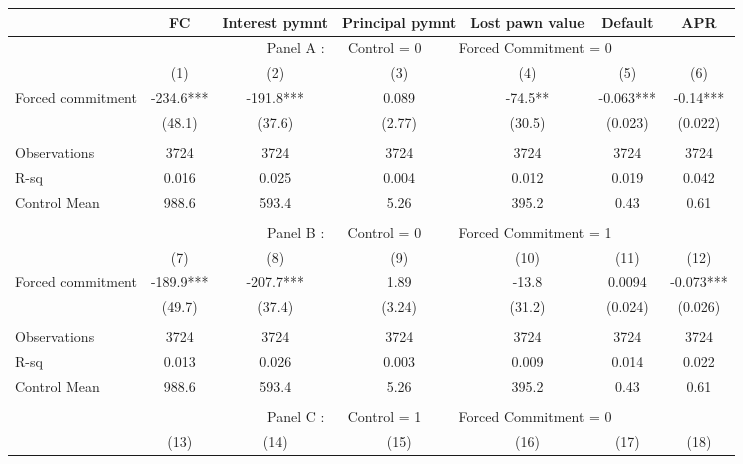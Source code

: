 \begin{tabular}{lcccccc}
\toprule
      & FC    & Interest pymnt & Principal pymnt & Lost pawn value & Default & APR \\
\midrule
      & \multicolumn{6}{c}{Panel A : $\quad$ Control  = 0           $\quad\quad$                  Forced Commitment = 0} \\
\midrule
\midrule
      & (1)   & (2)   & (3)   & (4)   & (5)   & (6) \\
\midrule
\midrule
Forced commitment  & -234.6*** & -191.8*** & 0.089 & -74.5** & -0.063*** & -0.14*** \\
      & (48.1) & (37.6) & (2.77) & (30.5) & (0.023) & (0.022) \\
      &       &       &       &       &       &  \\
\midrule
Observations & 3724  & 3724  & 3724  & 3724  & 3724  & 3724 \\
R-sq  & 0.016 & 0.025 & 0.004 & 0.012 & 0.019 & 0.042 \\
Control Mean & 988.6 & 593.4 & 5.26  & 395.2 & 0.43  & 0.61 \\
\midrule
\midrule
      &       &       &       &       &       &  \\
\midrule
      & \multicolumn{6}{c}{Panel B : $\quad$ Control  = 0         $\quad\quad$                    Forced Commitment = 1} \\
\midrule
\midrule
      & (7)   & (8)   & (9)   & (10)  & (11)  & (12) \\
\midrule
\midrule
Forced commitment  & -189.9*** & -207.7*** & 1.89  & -13.8 & 0.0094 & -0.073*** \\
      & (49.7) & (37.4) & (3.24) & (31.2) & (0.024) & (0.026) \\
      &       &       &       &       &       &  \\
\midrule
Observations & 3724  & 3724  & 3724  & 3724  & 3724  & 3724 \\
R-sq  & 0.013 & 0.026 & 0.003 & 0.009 & 0.014 & 0.022 \\
Control Mean & 988.6 & 593.4 & 5.26  & 395.2 & 0.43  & 0.61 \\
\midrule
\midrule
      &       &       &       &       &       &  \\
\midrule
      & \multicolumn{6}{c}{Panel C : $\quad$ Control  = 1        $\quad\quad$                     Forced Commitment = 0} \\
\midrule
\midrule
      & (13)  & (14)  & (15)  & (16)  & (17)  & (18) \\

\end{tabular}
